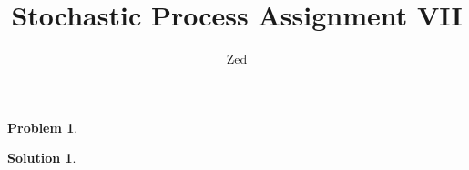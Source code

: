 \documentclass[a4paper, 10pt]{article}
\title{\textbf{Stochastic Process Assignment VII}}
\author{Zed}
\theoremstyle{definition}
\newtheorem{problem}{Problem}
\theoremstyle{hSol}
\newtheorem*{solution}{Solution}
\begin{document}
\maketitle

\begin{problem} 
\end{problem}
\begin{solution} 
\end{solution}
\end{document}
